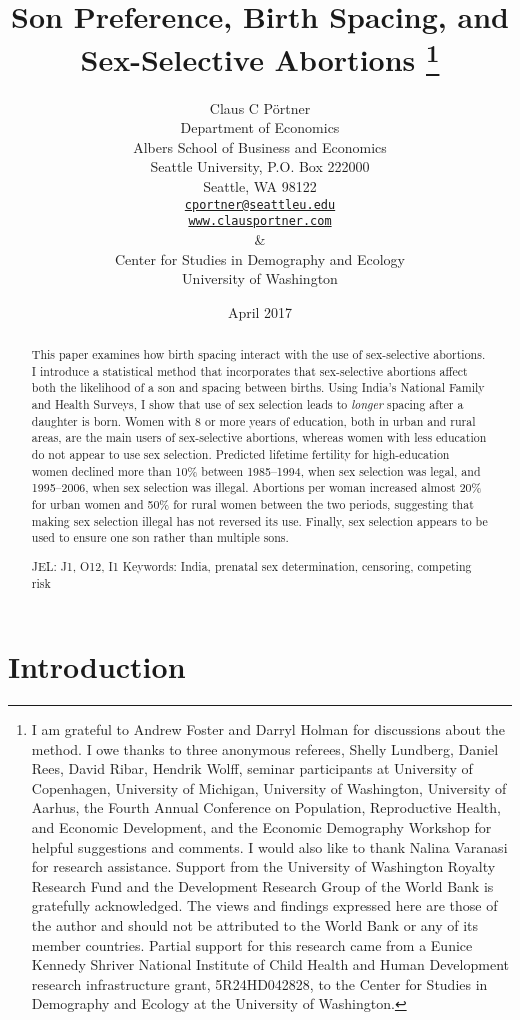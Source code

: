 \documentclass[12pt,letterpaper]{article}
\title{Son Preference, Birth Spacing, and Sex-Selective Abortions%
\protect\thanks{%
I am grateful to Andrew Foster and Darryl Holman for discussions about the method.
I owe thanks to three anonymous referees, Shelly Lundberg, Daniel Rees, David Ribar, 
Hendrik Wolff, seminar participants at University of Copenhagen, University of Michigan, 
University of Washington, University of Aarhus, the Fourth 
Annual Conference on Population, Reproductive Health, 
and Economic Development, and the Economic Demography Workshop for helpful suggestions and comments.
I would also like to thank Nalina Varanasi for research assistance.
Support from the University of Washington Royalty Research Fund and the 
Development Research Group of the World Bank is gratefully acknowledged.
The views and findings expressed here are those of the author and
should not be attributed to the World Bank or any of its member countries.
Partial support for this research came from a Eunice Kennedy Shriver National
Institute of Child Health and Human Development research infrastructure grant,
5R24HD042828, to the Center for Studies in Demography and Ecology at the
University of Washington.
}
}
\author{}
\author{Claus C P\"ortner\\
    Department of Economics\\
    Albers School of Business and Economics\\
    Seattle University, P.O. Box 222000\\
    Seattle, WA 98122\\
    \href{mailto:cportner@seattleu.edu}{\texttt{cportner@seattleu.edu}}\\
    \href{http://www.clausportner.com}{\texttt{www.clausportner.com}}\\
    \& \\
    Center for Studies in Demography and Ecology \\
    University of Washington\\ \vspace{2cm}
    }
\date{April 2017}
\begin{document}
\graphicspath{{figures/}}

\setcounter{page}{-1}
\maketitle
\thispagestyle{empty}

\newpage

\doublespacing


 
\maketitle
\thispagestyle{empty}


\newpage
\doublespacing


\begin{abstract}

\noindent This paper examines how birth spacing interact with the use of 
sex-selective abortions. 
I introduce a statistical method that incorporates that sex-selective abortions 
affect both the likelihood of a son and spacing between births.
Using India's National Family and Health Surveys,
I show that use of sex selection leads to \emph{longer} spacing after a daughter 
is born.
Women with 8 or more years of education, both in urban and rural areas, are 
the main users of sex-selective abortions, whereas women with less education 
do not appear to use sex selection.
Predicted lifetime fertility for high-education women declined more than 10\% 
between 1985--1994, when sex selection was legal, and 1995--2006, when sex selection 
was illegal.
Abortions per woman increased almost 20\% for urban women and 50\%
for rural women between the two periods, suggesting that making sex 
selection illegal has not reversed its use.
Finally, sex selection appears to be used to ensure one son rather 
than multiple sons.

\noindent JEL: J1, O12, I1
\noindent Keywords: India, prenatal sex determination, censoring, competing risk
\end{abstract}

\newpage



\section{Introduction\label{sec:intro}}
\end{document}
